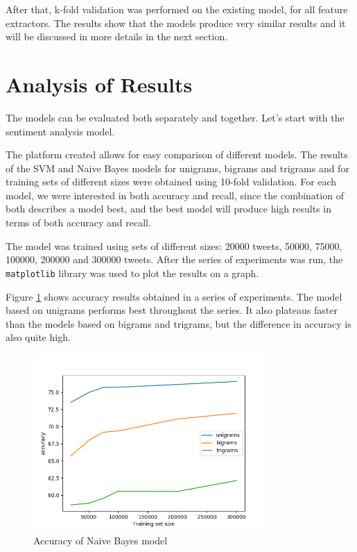 After that, k-fold validation was performed on the existing model, for all feature extractors. The results show that the models produce very similar results and it will be discussed in more details in the next section.

\section{Analysis of Results}
\label{sec:analysis}

The models can be evaluated both separately and together. Let's start with the sentiment analysis model.

The platform created allows for easy comparison of different models. The results of the SVM and Naive Bayes models for unigrams, bigrams and trigrams and for training sets of different sizes were obtained using 10-fold validation. For each model, we were interested in both accuracy and recall, since the combination of both describes a model best, and the best model will produce high results in terms of both accuracy and recall.

The model was trained using sets of different sizes: 20000 tweets, 50000, 75000, 100000, 200000 and 300000 tweets.  After the series of experiments was run, the \texttt{matplotlib} library was used to plot the results on a graph.

Figure \ref{fig:nbacc} shows accuracy results obtained in a series of experiments. The model based on unigrams performs best throughout the series. It also plateaus faster than the models based on bigrams and trigrams, but the difference in accuracy is also quite high. 

\begin{figure}[ht]
    \centering
    \includegraphics[width=0.8\textwidth]{NaiveBayesacc}
    \caption{Accuracy of Naive Bayes model}
    \label{fig:nbacc}
\end{figure}

